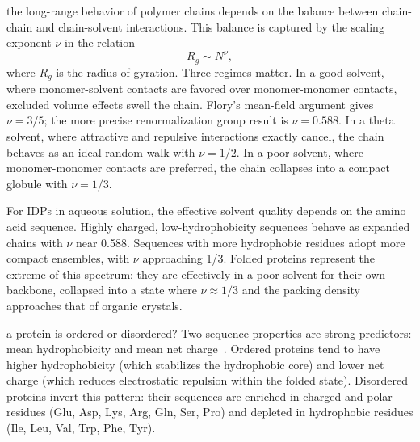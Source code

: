  the long-range behavior of polymer chains depends on
the balance between chain-chain and chain-solvent interactions.  This balance is captured by
the scaling exponent $\nu$ in the relation
%
\begin{equation}
  R_g \sim N^{\nu},
  \label{eq:scaling-law}
\end{equation}
%
\noindent where $R_g$ is the radius of gyration.  Three regimes matter.  In a good solvent,
where monomer-solvent contacts are favored over monomer-monomer contacts, excluded volume
effects swell the chain.  Flory's mean-field argument gives $\nu = 3/5$; the more precise
renormalization group result is $\nu = 0.588$.  In a theta solvent, where attractive and
repulsive interactions exactly cancel, the chain behaves as an ideal random walk with $\nu =
1/2$.  In a poor solvent, where monomer-monomer contacts are preferred, the chain collapses
into a compact globule with $\nu = 1/3$.

For IDPs in aqueous solution, the effective solvent quality depends on the amino acid
sequence.  Highly charged, low-hydrophobicity sequences behave as expanded chains with $\nu$
near 0.588.  Sequences with more hydrophobic residues adopt more compact ensembles, with
$\nu$ approaching 1/3.  Folded proteins represent the extreme of this spectrum: they are
effectively in a poor solvent for their own backbone, collapsed into a state where $\nu
\approx 1/3$ and the packing density approaches that of organic crystals.

 a protein is ordered or disordered?  Two sequence
properties are strong predictors: mean hydrophobicity and mean net
charge~\cite{uversky2000}.  Ordered proteins tend to have higher hydrophobicity (which
stabilizes the hydrophobic core) and lower net charge (which reduces electrostatic repulsion
within the folded state).  Disordered proteins invert this pattern: their sequences are
enriched in charged and polar residues (Glu, Asp, Lys, Arg, Gln, Ser, Pro) and depleted in
hydrophobic residues (Ile, Leu, Val, Trp, Phe, Tyr).

